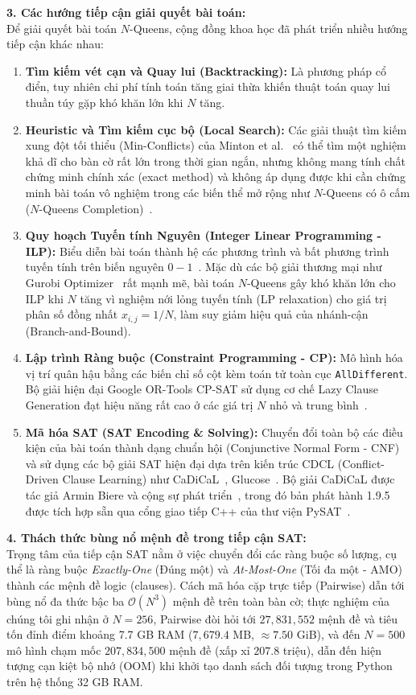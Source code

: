 \documentclass[11pt,a4paper]{article}
\begin{document}
\noindent\textbf{3. Các hướng tiếp cận giải quyết bài toán:}\\
Để giải quyết bài toán $N$-Queens, cộng đồng khoa học đã phát triển nhiều hướng tiếp cận khác nhau:
\begin{enumerate}
    \item \textbf{Tìm kiếm vét cạn và Quay lui (Backtracking):} Là phương pháp cổ điển, tuy nhiên chi phí tính toán tăng giai thừa khiến thuật toán quay lui thuần túy gặp khó khăn lớn khi $N$ tăng.
    \item \textbf{Heuristic và Tìm kiếm cục bộ (Local Search):} Các giải thuật tìm kiếm xung đột tối thiểu (Min-Conflicts) của Minton et al.~\cite{minton1992solving} có thể tìm một nghiệm khả dĩ cho bàn cờ rất lớn trong thời gian ngắn, nhưng không mang tính chất chứng minh chính xác (exact method) và không áp dụng được khi cần chứng minh bài toán vô nghiệm trong các biến thể mở rộng như $N$-Queens có ô cấm ($N$-Queens Completion)~\cite{gent2017complexity}.
    \item \textbf{Quy hoạch Tuyến tính Nguyên (Integer Linear Programming - ILP):} Biểu diễn bài toán thành hệ các phương trình và bất phương trình tuyến tính trên biến nguyên $0-1$~\cite{wolsey2020integer}. Mặc dù các bộ giải thương mại như Gurobi Optimizer~\cite{gurobi} rất mạnh mẽ, bài toán $N$-Queens gây khó khăn lớn cho ILP khi $N$ tăng vì nghiệm nới lỏng tuyến tính (LP relaxation) cho giá trị phân số đồng nhất $x_{i,j} = 1/N$, làm suy giảm hiệu quả của nhánh-cận (Branch-and-Bound).
    \item \textbf{Lập trình Ràng buộc (Constraint Programming - CP):} Mô hình hóa vị trí quân hậu bằng các biến chỉ số cột kèm toán tử toàn cục \texttt{AllDifferent}. Bộ giải hiện đại Google OR-Tools CP-SAT sử dụng cơ chế Lazy Clause Generation đạt hiệu năng rất cao ở các giá trị $N$ nhỏ và trung bình~\cite{ortools}.
    \item \textbf{Mã hóa SAT (SAT Encoding \& Solving):} Chuyển đổi toàn bộ các điều kiện của bài toán thành dạng chuẩn hội (Conjunctive Normal Form - CNF) và sử dụng các bộ giải SAT hiện đại dựa trên kiến trúc CDCL (Conflict-Driven Clause Learning) như CaDiCaL~\cite{biere2024cadical}, Glucose~\cite{audemard2018glucose}. Bộ giải CaDiCaL được tác giả Armin Biere và cộng sự phát triển~\cite{biere2024cadical}, trong đó bản phát hành 1.9.5 được tích hợp sẵn qua cổng giao tiếp C++ của thư viện PySAT~\cite{ignatiev2018pysat}.
\end{enumerate}

\noindent\textbf{4. Thách thức bùng nổ mệnh đề trong tiếp cận SAT:}\\
Trọng tâm của tiếp cận SAT nằm ở việc chuyển đổi các ràng buộc số lượng, cụ thể là ràng buộc \textit{Exactly-One} (Đúng một) và \textit{At-Most-One} (Tối đa một - AMO) thành các mệnh đề logic (clauses). Cách mã hóa cặp trực tiếp (Pairwise) dẫn tới bùng nổ đa thức bậc ba $\mathcal{O}(N^3)$ mệnh đề trên toàn bàn cờ; thực nghiệm của chúng tôi ghi nhận ở $N=256$, Pairwise đòi hỏi tới $27{,}831{,}552$ mệnh đề và tiêu tốn đỉnh điểm khoảng 7.7 GB RAM ($7{,}679.4$ MB, $\approx 7.50$ GiB), và đến $N=500$ mô hình chạm mốc $207{,}834{,}500$ mệnh đề (xấp xỉ $207.8$ triệu), dẫn đến hiện tượng cạn kiệt bộ nhớ (OOM) khi khởi tạo danh sách đối tượng trong Python trên hệ thống 32 GB RAM.
\end{document}
